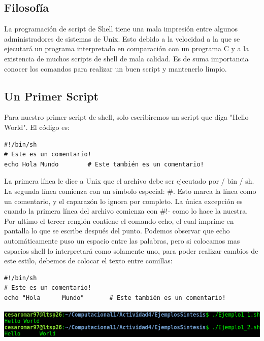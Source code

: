\documentclass[12pt]{article}
\begin{document}
\subsection*{Filosofía}
La programación de script de Shell tiene una mala impresión entre algunos administradores de sistemas de Unix. Esto debido a la velocidad a la que se ejecutará un programa interpretado en comparación con un programa C y a la existencia de muchos scripts de shell de mala calidad. Es de suma importancia conocer los comandos para realizar un buen script y mantenerlo limpio.

\subsection*{Un Primer Script}
Para nuestro primer script de shell, solo escribiremos un script que diga "Hello World". El código es:
\begin{verbatim}
#!/bin/sh
# Este es un comentario!
echo Hola Mundo        # Este también es un comentario!
\end{verbatim}
La primera línea le dice a Unix que el archivo debe ser ejecutado por / bin / sh. La segunda línea comienza con un símbolo especial: \#. Esto marca la línea como un comentario, y el caparazón lo ignora por completo. La única excepción es cuando la primera línea del archivo comienza con \#!- como lo hace la nuestra.
Por ultimo el tercer renglón contiene el comando echo, el cual imprime en  pantalla lo que se escribe después del punto.
Podemos observar que echo automáticamente puso un espacio entre las palabras, pero si colocamos mas espacios shell lo interpretará como solamente uno, para poder realizar cambios de este estilo, debemos de colocar el texto entre comillas:
\begin{verbatim}
#!/bin/sh
# Este es un comentario!
echo "Hola      Mundo"       # Este también es un comentario!
\end{verbatim}
\begin{center}
	\includegraphics[height=1.5cm]{hello.png}
\end{center}
\end{document}
